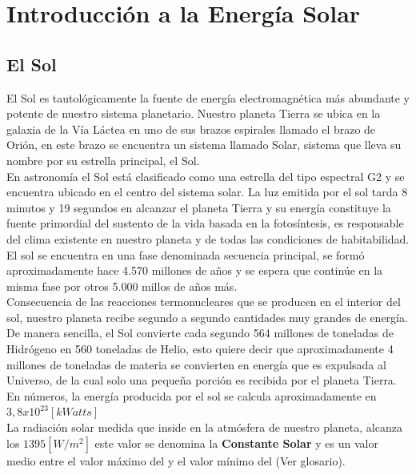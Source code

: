 \chapter{Introducción a la Energía Solar}
\label{solar}

\section{El Sol}
\label{elSol}
El Sol es tautológicamente la fuente de energía electromagnética más abundante y potente de nuestro sistema planetario. Nuestro planeta Tierra se ubica en la galaxia de la Vía Láctea en uno de sus brazos espirales llamado el brazo de Orión, en este brazo se encuentra un sistema llamado Solar\cite{solar:1}, sistema que lleva su nombre por su estrella principal, el Sol.\\

En astronomía el Sol está clasificado como una estrella del tipo espectral G2 y se encuentra ubicado en el centro del sistema solar. La luz emitida por el sol tarda 8 minutos y 19 segundos\cite{solar:2} en alcanzar el planeta Tierra y su energía constituye la fuente primordial del sustento de la vida basada en la fotosíntesis, es responsable del clima existente en nuestro planeta y de todas las condiciones de habitabilidad.\\

El sol se encuentra en una fase denominada secuencia principal, se formó aproximadamente hace 4.570 millones de años y se espera que continúe en la misma fase por otros 5.000 millos de años más\cite{solar:4}.\\
Consecuencia de las reacciones termonucleares que se producen en el interior del sol, nuestro planeta recibe segundo a segundo cantidades muy grandes de energía. De manera sencilla, el Sol convierte cada segundo 564 millones de toneladas de Hidrógeno en 560 toneladas de Helio, esto quiere decir que aproximadamente 4 millones de toneladas de materia se convierten en energía que es expulsada al Universo, de la cual solo una pequeña porción es recibida por el planeta Tierra. En números, la energía producida por el sol se calcula aproximadamente en $3,8 x {10}^{23} [kWatts]$\cite{solar:3}\\

La radiación solar medida que inside en la atmósfera de nuestro planeta, alcanza los $1395 [W/{m}^{2}]$ este valor se denomina la \textbf{Constante Solar} y es un valor medio entre el valor máximo del  y el valor mínimo del  (Ver glosario).\\


